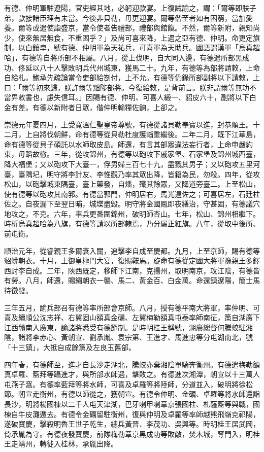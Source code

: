 \begin{pinyinscope}
有德、仲明軍駐遼陽，官吏經其地，必躬迎款宴。上復誡諭之，謂：「爾等即朕子弟，款接諸臣理有未當。今後非貝勒，毋更迎宴。爾等偕至者如有困窮，當加愛養。爾等或遣使詣盛京，當令使者告禮部，禮部與館餼。不然，爾等新附，親知尚少，使來無居無食，不重困乎？」及尚可喜來降，上遇之亞有德、仲明。命更定旗制，以白鑲皁，號有德、仲明軍為天祐兵，可喜軍為天助兵。國語謂漢軍「烏真超哈」，有德等自將所部不相屬。八月，從上伐明，自大同入邊，有德遣所部黑成功、佟延以八十人擊敗明兵代州城東，獲馬二十。九年，有德等為部將請敕，上命自給札。鮑承先疏論當令吏部給劄付，上不允。有德等仍錄所部副將以下請敕，上曰：「爾等初來歸，朕許爾等黜陟部將。今復給敕，是背前言。朕非謂爾等無功不當畀敕書也，慮失信耳。」因賜有德、仲明、可喜人緞一、貂皮六十，副將以下白金有差。有德以新附者日眾，偕仲明輸糧佐餉，上卻之。

崇德元年夏四月，上受寬溫仁聖皇帝尊號，有德從諸貝勒奉寶以進，封恭順王。十二月，上自將伐朝鮮，命有德等從貝勒杜度護輜重繼後。二年二月，既下江華島，命有德等從貝子碩託以水師取皮島。師還，有言其部眾違法妄行者，上命申嚴約束，毋蹈故轍。三年，從攻錦州，有德等以砲攻下戚家堡、石家堡及錦州城西臺，降大福堡；又以砲攻下大臺一，俘男婦三百七十九，盡戮其男子；又以砲攻五里河臺，臺隅圮，明守將李計友、李惟觀乃率其眾出降，皆籍為民，勿殺。四年，從攻松山，以砲擊城東隅臺，臺上藥發，自燔，殲其餘眾，又降道旁臺二。上至松山，使有德等以砲攻其南郛。有德當郭門，仲明居右，馬光遠佐之；可喜居左，石廷柱佐之。自夜漏下至翌日晡，城堞盡毀。明守將金國鳳即夜繕治，守甚固，有德議穴地攻之，不克。六年，率兵更番圍錦州，破明師杏山。七年，松山、錦州相繼下。時析烏真超哈為八旗，有德等請以所部隸焉，乃分屬正紅旗。八年，從取中後所、前屯衛。

順治元年，從睿親王多爾袞入關，追擊李自成至慶都。九月，上至京師，賜有德等貂蟒朝衣。十月，上御皇極門大宴，復賜鞍馬。旋命有德從定國大將軍豫親王多鐸西討李自成。二年，陜西既定，移師下江南，克揚州，取明南京，攻江陰，有德皆有勞。八月，師還，賜繡朝衣一襲、馬二、黃金百、白金萬。命還鎮遼陽，簡士馬待徵發。

三年五月，諭兵部召有德等率所部會京師。八月，授有德平南大將軍，率仲明、可喜及續順公沈志祥、右翼固山額真金礪、左翼梅勒額真屯泰率師南征，策自湖廣下江西贛南入廣東，諭諸將悉受有德節制。是時明桂王稱號，湖廣總督何騰蛟駐湘陰，諸將李赤心、黃朝宣、劉承胤、袁宗第、王進才、馬進忠等分屯湖南北，號「十三鎮」，大抵自成餘黨及左良玉舊部。

四年春，有德師至，進才自長沙走湖北，騰蛟亦棄湘陰單騎奔衡州。有德遣梅勒額真卓羅、藍拜等躡進才，與所部水師遇，擊敗之。有德進次湘潭，朝宣以十三萬人屯燕子窩。有德率藍拜等將水師，可喜及卓羅等將陸師，分道並入，破明將徐松節。朝宣走衡州，有德以師從之，獲朝宣。有德令仲明、金礪、卓羅等將水師還詣長沙，明將楊國棟以二千人屯天津湖，巴牙喇甲喇章京張國柱、札薩藍等與戰，國棟自牛皮灘遁去。有德令金礪留駐衡州，復與仲明及卓羅等率師越熊飛嶺克祁陽，遂破寶慶，擊殺明魯王世子乾生，總兵黃晉、李茂功、吳興等。時明桂王居武岡，倚承胤為守。有德夜發寶慶，前隊梅勒章京黑成功等敗敵，焚木城，奪門入，明桂王走靖州，轉徙入桂林，承胤出降。


\end{pinyinscope}
